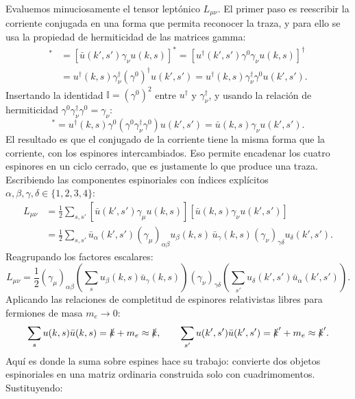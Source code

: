 \documentclass[10pt,a4paper]{article}
\begin{document}
Evaluemos minuciosamente el tensor leptónico $L_{\mu\nu}$. El primer paso es reescribir la corriente conjugada en una forma que permita reconocer la traza, y para ello se usa la propiedad de hermiticidad de las matrices gamma:
\begin{align}
[j_\nu^e]^* &= [\bar{u}(k', s') \gamma_\nu u(k, s)]^* = [u^\dagger(k', s') \gamma^0 \gamma_\nu u(k, s)]^\dagger \nonumber \\
&= u^\dagger(k, s) \gamma_\nu^\dagger (\gamma^0)^\dagger u(k', s') = u^\dagger(k, s) \gamma_\nu^\dagger \gamma^0 u(k', s').
\end{align}
Insertando la identidad $\mathbb{I} = (\gamma^0)^2$ entre $u^\dagger$ y $\gamma_\nu^\dagger$, y usando la relación de hermiticidad $\gamma^0 \gamma_\nu^\dagger \gamma^0 = \gamma_\nu$:
\begin{equation}
[j_\nu^e]^* = u^\dagger(k, s) \gamma^0 (\gamma^0 \gamma_\nu^\dagger \gamma^0) u(k', s') = \bar{u}(k, s) \gamma_\nu u(k', s').
\end{equation}
El resultado es que el conjugado de la corriente tiene la misma forma que la corriente, con los espinores intercambiados. Eso permite encadenar los cuatro espinores en un ciclo cerrado, que es justamente lo que produce una traza. Escribiendo las componentes espinoriales con índices explícitos $\alpha, \beta, \gamma, \delta \in \{1, 2, 3, 4\}$:
\begin{align}
L_{\mu\nu} &= \frac{1}{2} \sum_{s, s'} [\bar{u}(k', s') \gamma_\mu u(k, s)] [\bar{u}(k, s) \gamma_\nu u(k', s')] \nonumber \\
&= \frac{1}{2} \sum_{s, s'} \bar{u}_\alpha(k', s') (\gamma_\mu)_{\alpha\beta} u_\beta(k, s) \, \bar{u}_\gamma(k, s) (\gamma_\nu)_{\gamma\delta} u_\delta(k', s').
\end{align}
Reagrupando los factores escalares:
\begin{equation}
L_{\mu\nu} = \frac{1}{2} (\gamma_\mu)_{\alpha\beta} \left( \sum_s u_\beta(k, s) \bar{u}_\gamma(k, s) \right) (\gamma_\nu)_{\gamma\delta} \left( \sum_{s'} u_\delta(k', s') \bar{u}_\alpha(k', s') \right).
\end{equation}
Aplicando las relaciones de completitud de espinores relativistas libres para fermiones de masa $m_e \to 0$:
\begin{equation}
\sum_s u(k, s) \bar{u}(k, s) = \slashed{k} + m_e \approx \slashed{k}, \qquad \sum_{s'} u(k', s') \bar{u}(k', s') = \slashed{k}' + m_e \approx \slashed{k}'.
\end{equation}
Aquí es donde la suma sobre espines hace su trabajo: convierte dos objetos espinoriales en una matriz ordinaria construida solo con cuadrimomentos. Sustituyendo:
\end{document}
